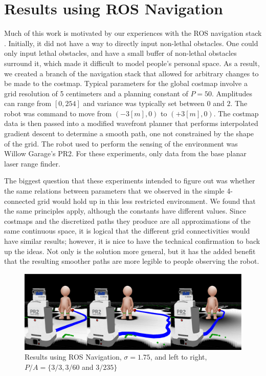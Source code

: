 \section{Results using ROS Navigation}
Much of this work is motivated by our experiences with the ROS navigation stack \cite{marder:office}. Initially, it did not have a way to directly input non-lethal obstacles. One could only input lethal obstacles, and have a small buffer of non-lethal obstacles surround it, which made it difficult to model people's personal space. As a result, we created a branch of the navigation stack that allowed for arbitrary changes to be made to the costmap. Typical parameters for the global costmap involve a grid resolution of 5 centimeters and a planning constant of $P=50$. Amplitudes can range from $[0, 254]$ and variance was typically set between $0$ and $2$. The robot was command to move from $(-3[m], 0)$ to $(+3[m], 0)$. The costmap data is then passed into a modified wavefront planner that performs interpolated gradient descent to determine a smooth path, one not constrained by the shape of the grid. The robot used to perform the sensing of the environment was Willow Garage's PR2. For these experiments, only data from the base planar laser range finder. 

The biggest question that these experiments intended to figure out was whether the same relations between parameters that we observed in the simple 4-connected grid would hold up in this less restricted environment. We found that the same principles apply, although the constants have different values. Since costmaps and the discretized paths they produce are all approximations of the same continuous space, it is logical that the different grid connectivities would have similar results; however, it is nice to have the technical confirmation to back up the ideas. Not only is the solution more general, but it has the added benefit that the resulting smoother paths are more legible to people observing the robot. 

\begin{figure}[b]
\centering
\includegraphics[width=\textwidth]{graphix/PR2-A.png}
\caption{Results using ROS Navigation, $\sigma=1.75$, and left to right, $P/A = \{3/3, 3/60$ and $3/235\}$}
\label{fig:A}
\end{figure}

